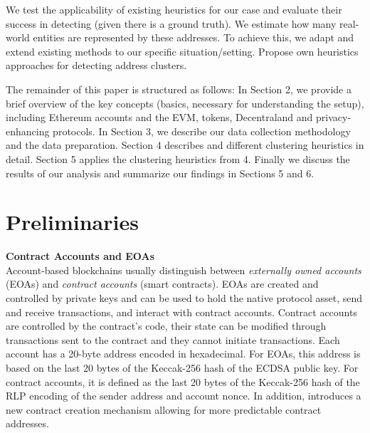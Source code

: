 \documentclass[12pt,a4paper,titlepage,oneside,english]{article}
\begin{document}
We test the applicability of existing heuristics for our case and evaluate their success in detecting (given there is a ground truth). We estimate how many real-world entities are represented by these addresses. To achieve this, we adapt and extend existing methods to our specific situation/setting. Propose own heuristics approaches for detecting address clusters.


The remainder of this paper is structured as follows: In Section 2, we provide a brief overview of the key concepts (basics, necessary for understanding the setup), including Ethereum accounts and the EVM, tokens, Decentraland and privacy-enhancing protocols. In Section 3, we describe our data collection methodology and the data preparation. Section 4  describes and different clustering heuristics in detail. Section 5 applies the clustering heuristics from 4. Finally we discuss the results of our analysis and summarize our findings in Sections 5 and 6.





\section{Preliminaries}

\textbf{Contract Accounts and EOAs}\\
Account-based blockchains usually distinguish between \textit{externally owned accounts} (EOAs) and \textit{contract accounts} (smart contracts). EOAs are created and controlled by private keys and can be used to hold the native protocol asset, send and receive transactions, and interact with contract accounts. Contract accounts are controlled by the contract's code, their state can be modified through transactions sent to the contract and they cannot initiate transactions. \citep{buterin2014ethereum} \newline Each account has a 20-byte address encoded in hexadecimal. For EOAs, this address is based on the last 20 bytes of the Keccak-256 hash of the ECDSA public key. For contract accounts, it is defined as the last 20 bytes of the Keccak-256 hash of the RLP encoding of the sender address and account nonce. \citep{GW:14} \newline
In addition, \cite{eip1014} introduces a new contract creation mechanism allowing for more predictable contract addresses.%
\end{document}
